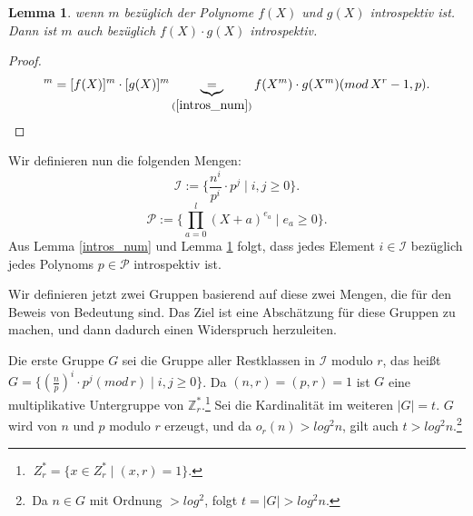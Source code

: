 \documentclass[12pt,oneside]{article}
\newtheorem{lemma}[theorem]{Lemma}
\theoremstyle{remark}
\theoremstyle{definition}
\begin{document}
\smallskip

\begin{lemma}\label{intros_pol}
wenn $m$ bezüglich der Polynome $f(X)$ und $g(X)$ introspektiv ist. Dann ist $m$ auch bezüglich $f(X) \cdot g(X)$ introspektiv.  
\end{lemma}
\begin{proof}
\begin{align*}
    [f(X) \cdot g(X)]^{m} = [f(X)]^m \cdot [g(X)]^m \underbrace{=}_{(\ref{intros_num})} f(X^m) \cdot g(X^m)(mod \, X^r - 1, p).
\end{align*}

\end{proof}

Wir definieren nun die folgenden Mengen:\newline\newline
\begin{equation}\label{I_Set}
      \mathcal{I} := \{ \frac{n^i}{p^i} \cdot p^j \mid i,j \geq 0\}.
\end{equation}
\begin{equation}
     \mathcal{P} := \{ \prod_{a = 0}^{l} (X + a)^{e_{a}} \mid e_{a} \geq 0 \}.
\end{equation}\label{P_Set}
\newline\newline
Aus Lemma \ref{intros_num} und Lemma \ref{intros_pol} folgt, dass jedes Element $i \in \mathcal{I}$ bezüglich jedes Polynoms $p \in \mathcal{P}$ introspektiv ist.\newline\newline

Wir definieren jetzt zwei Gruppen basierend auf diese zwei Mengen, die für den Beweis von Bedeutung sind. Das Ziel ist eine Abschätzung für diese Gruppen zu machen, und dann dadurch einen Widerspruch herzuleiten.\newline\newline

Die erste Gruppe $G$ sei die Gruppe aller Restklassen in $\mathcal{I}$ modulo $r$, das heißt $G = \{(\frac{n}{p})^i \cdot p^j ( mod \, r) \mid i,j \geq 0 \}$. Da $(n,r) = (p,r) = 1 $ ist $G$ eine multiplikative Untergruppe von $\mathbb{Z}_{r}^{*}$.\footnote{$\; {Z}_{r}^{*} = \{ x \in Z_{r}^{*} \mid (x,r) =1 \}$.} Sei die Kardinalität im weiteren $ | G | = t $. $G$ wird von $n$ und $p$ modulo $r$ erzeugt, und da $o_{r}(n) > log^2 n$, gilt auch $t > log^2 n$.\footnote{$ \,$Da $n \in G$ mit Ordnung $> log^2 $, folgt $t = |G| > log^2n$.}\newline\newline
\end{document}
